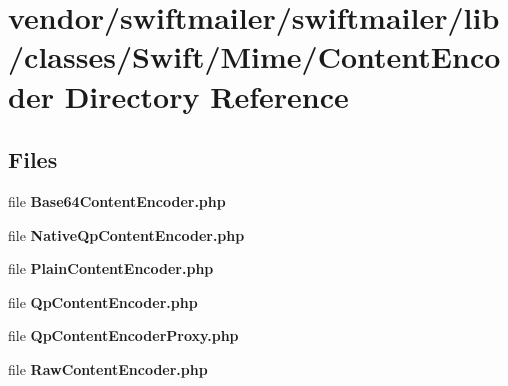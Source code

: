 \section{vendor/swiftmailer/swiftmailer/lib/classes/\+Swift/\+Mime/\+Content\+Encoder Directory Reference}
\label{dir_96181f7eb0d7ac95cb1e0586576f44a1}
\subsection*{Files}
\begin{DoxyCompactItemize}
\item 
file {\bf Base64\+Content\+Encoder.\+php}
\item 
file {\bf Native\+Qp\+Content\+Encoder.\+php}
\item 
file {\bf Plain\+Content\+Encoder.\+php}
\item 
file {\bf Qp\+Content\+Encoder.\+php}
\item 
file {\bf Qp\+Content\+Encoder\+Proxy.\+php}
\item 
file {\bf Raw\+Content\+Encoder.\+php}
\end{DoxyCompactItemize}
